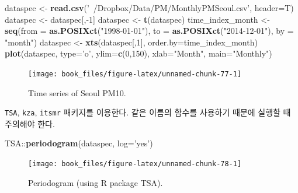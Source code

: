 \documentclass[b5paper,]{book}
\makeatletter
\newenvironment{Shaded}{\begin{snugshade}}{\end{snugshade}}
\newcommand{\KeywordTok}[1]{\textcolor[rgb]{0.13,0.29,0.53}{\textbf{{#1}}}}
\newcommand{\DataTypeTok}[1]{\textcolor[rgb]{0.13,0.29,0.53}{{#1}}}
\newcommand{\DecValTok}[1]{\textcolor[rgb]{0.00,0.00,0.81}{{#1}}}
\newcommand{\StringTok}[1]{\textcolor[rgb]{0.31,0.60,0.02}{{#1}}}
\newcommand{\NormalTok}[1]{{#1}}
\newenvironment{kframe}{%
\medskip{}
\setlength{\fboxsep}{.8em}
 \def\at@end@of@kframe{}%
 \ifinner\ifhmode%
  \def\at@end@of@kframe{\end{minipage}}%
  \begin{minipage}{\columnwidth}%
 \fi\fi%
 \def\FrameCommand##1{\hskip\@totalleftmargin \hskip-\fboxsep
 \colorbox{shadecolor}{##1}\hskip-\fboxsep
     \hskip-\linewidth \hskip-\@totalleftmargin \hskip\columnwidth}%
 \MakeFramed {\advance\hsize-\width
   \@totalleftmargin\z@ \linewidth\hsize
   \@setminipage}}%
 {\par\unskip\endMakeFramed%
 \at@end@of@kframe}
\renewenvironment{Shaded}{\begin{kframe}}{\end{kframe}}
\theoremstyle{definition}
\theoremstyle{definition}
\theoremstyle{definition}
\theoremstyle{remark}
\makeatother
\begin{document}
\begin{Shaded}
\begin{Highlighting}[]
\NormalTok{dataspec <-}\StringTok{ }\KeywordTok{read.csv}\NormalTok{(}\StringTok{'~/Dropbox/Data/PM/MonthlyPMSeoul.csv'}\NormalTok{, }\DataTypeTok{header=}\NormalTok{T)}
\NormalTok{dataspec <-}\StringTok{ }\NormalTok{dataspec[,-}\DecValTok{1}\NormalTok{]}
\NormalTok{dataspec <-}\StringTok{ }\KeywordTok{t}\NormalTok{(dataspec)}
\NormalTok{time_index_month <-}\StringTok{ }\KeywordTok{seq}\NormalTok{(}\DataTypeTok{from =} \KeywordTok{as.POSIXct}\NormalTok{(}\StringTok{"1998-01-01"}\NormalTok{), }\DataTypeTok{to =} \KeywordTok{as.POSIXct}\NormalTok{(}\StringTok{"2014-12-01"}\NormalTok{), }\DataTypeTok{by =} \StringTok{"month"}\NormalTok{)}
\NormalTok{dataspec <-}\StringTok{ }\KeywordTok{xts}\NormalTok{(dataspec[,}\DecValTok{1}\NormalTok{], }\DataTypeTok{order.by=}\NormalTok{time_index_month)}
\KeywordTok{plot}\NormalTok{(dataspec, }\DataTypeTok{type=}\StringTok{'o'}\NormalTok{, }\DataTypeTok{ylim=}\KeywordTok{c}\NormalTok{(}\DecValTok{0}\NormalTok{,}\DecValTok{150}\NormalTok{), }\DataTypeTok{xlab=}\StringTok{"Month"}\NormalTok{, }\DataTypeTok{main=}\StringTok{"Monthly"}\NormalTok{)}
\end{Highlighting}
\end{Shaded}

\begin{figure}

{\centering \texttt{[image: book\_files/figure-latex/unnamed-chunk-77-1]} 

}

\caption{Time series of Seoul PM10.}\label{fig:unnamed-chunk-77}
\end{figure}

\texttt{TSA}, \texttt{kza}, \texttt{itsmr} 패키지를 이용한다. 같은
이름의 함수를 사용하기 때문에 실행할 때 주의해야 한다.

\begin{Shaded}
\begin{Highlighting}[]
\NormalTok{TSA::}\KeywordTok{periodogram}\NormalTok{(dataspec, }\DataTypeTok{log=}\StringTok{'yes'}\NormalTok{)}
\end{Highlighting}
\end{Shaded}

\begin{figure}

{\centering \texttt{[image: book\_files/figure-latex/unnamed-chunk-78-1]} 

}

\caption{Periodogram (using R package TSA).}\label{fig:unnamed-chunk-78}
\end{figure}
\end{document}
